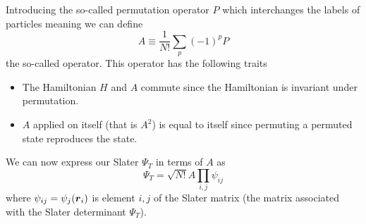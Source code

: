 
\chapter{\label{appendix:A}}
        Introducing the so-called permutation operator $P$ which interchanges
        the labels of particles meaning we can define
            \begin{equation}
                A \equiv \frac{1}{N!}\sum_p(-1)^pP
            \end{equation}
        the so-called  operator. This operator has
        the following traits
            \begin{itemize}
                \item The Hamiltonian $H$ and $A$ commute since the Hamiltonian
                    is invariant under permutation.
                \item $A$ applied on itself (that is $A^2$) is equal to itself
                    since permuting a permuted state reproduces the state.
            \end{itemize}
        We can now express our Slater $\Psi_T$ in terms of $A$ as
            \begin{equation}
                \Psi_T = \sqrt{N!}A\prod_{i,j}\psi_{ij}
            \end{equation}
        where $\psi_{ij}=\psi_j(\boldsymbol{{r}}_i)$ is element $i,j$ of the Slater
        matrix (the matrix associated with the Slater determinant $\Psi_T$).

